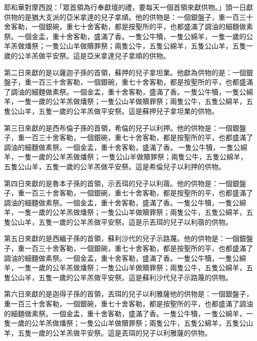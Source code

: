 耶和華對摩西說：「眾首領為行奉獻壇的禮，要每天一個首領來獻供物。」頭一日獻供物的是猶大支派的亞米拿達的兒子拿順。他的供物是：一個銀盤子，重一百三十舍客勒，一個銀碗，重七十舍客勒，都是按聖所的平，也都盛滿了調油的細麵做素祭。一個金盂，重十舍客勒，盛滿了香。一隻公牛犢，一隻公綿羊，一隻一歲的公羊羔做燔祭；一隻公山羊做贖罪祭；兩隻公牛，五隻公綿羊，五隻公山羊，五隻一歲的公羊羔做平安祭。這是亞米拿達兒子拿順的供物。

第二日來獻的是以薩迦子孫的首領，蘇押的兒子拿坦業。他獻為供物的是：一個銀盤子，重一百三十舍客勒，一個銀碗，重七十舍客勒，都是按聖所的平，也都盛滿了調油的細麵做素祭。一個金盂，重十舍客勒，盛滿了香。一隻公牛犢，一隻公綿羊，一隻一歲的公羊羔做燔祭；一隻公山羊做贖罪祭；兩隻公牛，五隻公綿羊，五隻公山羊，五隻一歲的公羊羔做平安祭。這是蘇押兒子拿坦業的供物。

第三日來獻的是西布倫子孫的首領，希倫的兒子以利押。他的供物是：一個銀盤子，重一百三十舍客勒，一個銀碗，重七十舍客勒，都是按聖所的平，也都盛滿了調油的細麵做素祭。一個金盂，重十舍客勒，盛滿了香。 一隻公牛犢，一隻公綿羊，一隻一歲的公羊羔做燔祭； 一隻公山羊做贖罪祭；兩隻公牛，五隻公綿羊，五隻公山羊，五隻一歲的公羊羔做平安祭。這是希倫兒子以利押的供物。

第四日來獻的是魯本子孫的首領，示丟珥的兒子以利蓿。他的供物是：一個銀盤子，重一百三十舍客勒，一個銀碗，重七十舍客勒，都是按聖所的平，也都盛滿了調油的細麵做素祭。一個金盂，重十舍客勒，盛滿了香。一隻公牛犢，一隻公綿羊，一隻一歲的公羊羔做燔祭；一隻公山羊做贖罪祭；兩隻公牛，五隻公綿羊，五隻公山羊，五隻一歲的公羊羔做平安祭。這是示丟珥的兒子以利蓿的供物。

第五日來獻的是西緬子孫的首領，蘇利沙代的兒子示路蔑。他的供物是：一個銀盤子，重一百三十舍客勒，一個銀碗，重七十舍客勒，都是按聖所的平，也都盛滿了調油的細麵做素祭。一個金盂，重十舍客勒，盛滿了香。一隻公牛犢，一隻公綿羊，一隻一歲的公羊羔做燔祭；一隻公山羊做贖罪祭；兩隻公牛，五隻公綿羊，五隻公山羊，五隻一歲的公羊羔做平安祭。這是蘇利沙代兒子示路蔑的供物。


第六日來獻的是迦得子孫的首領，丟珥的兒子以利雅薩他的供物是：一個銀盤子，重一百三十舍客勒，一個銀碗，重七十舍客勒，都是按聖所的平，也都盛滿了調油的細麵做素祭。一個金盂，重十舍客勒，盛滿了香。一隻公牛犢，一隻公綿羊，一隻一歲的公羊羔做燔祭；一隻公山羊做贖罪祭；兩隻公牛，五隻公綿羊，五隻公山羊，五隻一歲的公羊羔做平安祭。這是丟珥的兒子以利雅薩的供物。

